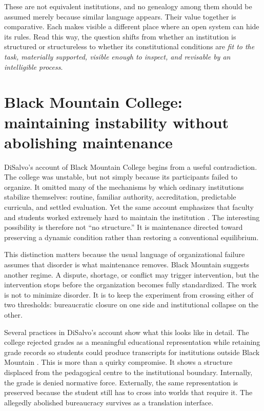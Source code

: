 \documentclass[11pt]{article}
\begin{document}
These are not equivalent institutions, and no genealogy among them should be assumed merely because similar language appears. Their value together is comparative. Each makes visible a different place where an open system can hide its rules. Read this way, the question shifts from whether an institution is structured or structureless to whether its constitutional conditions are \emph{fit to the task, materially supported, visible enough to inspect, and revisable by an intelligible process}.

\section{Black Mountain College: maintaining instability without abolishing maintenance}

DiSalvo's account of Black Mountain College begins from a useful contradiction. The college was unstable, but not simply because its participants failed to organize. It omitted many of the mechanisms by which ordinary institutions stabilize themselves: routine, familiar authority, accreditation, predictable curricula, and settled evaluation. Yet the same account emphasizes that faculty and students worked extremely hard to maintain the institution \cite{disalvo2026blackmountainmess}. The interesting possibility is therefore not ``no structure.'' It is maintenance directed toward preserving a dynamic condition rather than restoring a conventional equilibrium.

This distinction matters because the usual language of organizational failure assumes that disorder is what maintenance removes. Black Mountain suggests another regime. A dispute, shortage, or conflict may trigger intervention, but the intervention stops before the organization becomes fully standardized. The work is not to minimize disorder. It is to keep the experiment from crossing either of two thresholds: bureaucratic closure on one side and institutional collapse on the other.

Several practices in DiSalvo's account show what this looks like in detail. The college rejected grades as a meaningful educational representation while retaining grade records so students could produce transcripts for institutions outside Black Mountain \cite{disalvo2026blackmountainmess}. This is more than a quirky compromise. It shows a structure displaced from the pedagogical centre to the institutional boundary. Internally, the grade is denied normative force. Externally, the same representation is preserved because the student still has to cross into worlds that require it. The allegedly abolished bureaucracy survives as a translation interface.
\end{document}
